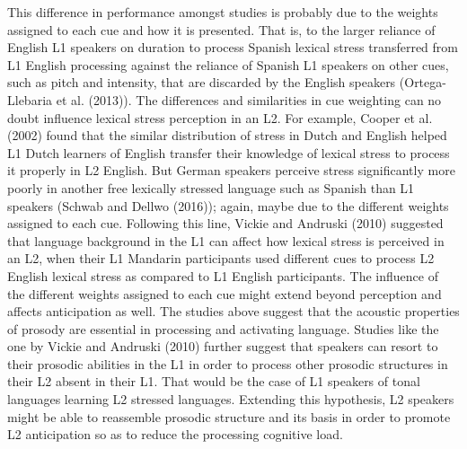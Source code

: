 \documentclass[english,man]{apa6}
\begin{document}
This difference in performance amongst studies is probably due to the weights assigned to each cue and how it is presented. That is, to the larger reliance of English L1 speakers on duration to process Spanish lexical stress transferred from L1 English processing against the reliance of Spanish L1 speakers on other cues, such as pitch and intensity, that are discarded by the English speakers (Ortega-Llebaria et al. (2013)). The differences and similarities in cue weighting can no doubt influence lexical stress perception in an L2. For example, Cooper et al. (2002) found that the similar distribution of stress in Dutch and English helped L1 Dutch learners of English transfer their knowledge of lexical stress to process it properly in L2 English. But German speakers perceive stress significantly more poorly in another free lexically stressed language such as Spanish than L1 speakers (Schwab and Dellwo (2016)); again, maybe due to the different weights assigned to each cue. Following this line, Vickie and Andruski (2010) suggested that language background in the L1 can affect how lexical stress is perceived in an L2, when their L1 Mandarin participants used different cues to process L2 English lexical stress as compared to L1 English participants.
The influence of the different weights assigned to each cue might extend beyond perception and affects anticipation as well. The studies above suggest that the acoustic properties of prosody are essential in processing and activating language. Studies like the one by Vickie and Andruski (2010) further suggest that speakers can resort to their prosodic abilities in the L1 in order to process other prosodic structures in their L2 absent in their L1. That would be the case of L1 speakers of tonal languages learning L2 stressed languages. Extending this hypothesis, L2 speakers might be able to reassemble prosodic structure and its basis in order to promote L2 anticipation so as to reduce the processing cognitive load.
\end{document}
